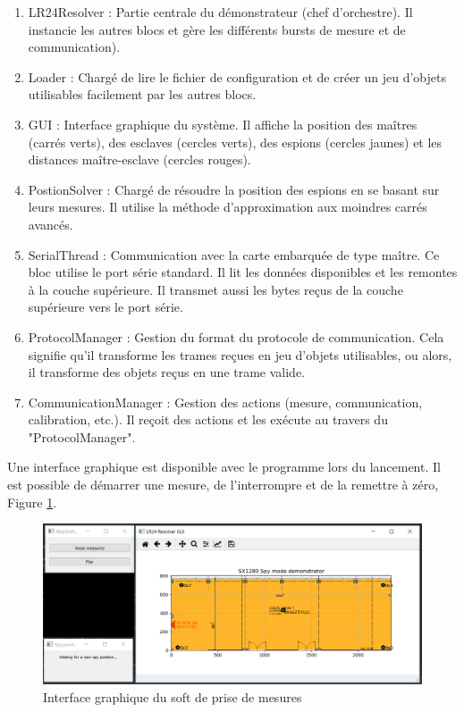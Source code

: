 \begin{enumerate}
 \item LR24Resolver : Partie centrale du démonstrateur (chef d’orchestre). Il instancie les autres blocs et gère les différents bursts de mesure et de communication).
 \item Loader : Chargé de lire le fichier de configuration et de créer un jeu d’objets utilisables facilement par les autres blocs.
 \item GUI : Interface graphique du système. Il affiche la position des maîtres (carrés verts), des esclaves (cercles verts), des espions (cercles jaunes) et les distances maître-esclave (cercles rouges).
 \item PostionSolver : Chargé de résoudre la position des espions en se basant sur leurs mesures. Il utilise la méthode d’approximation aux moindres carrés avancés.
 \item SerialThread : Communication avec la carte embarquée de type maître. Ce bloc utilise le port série standard. Il lit les données disponibles et les remontes à la couche supérieure. Il transmet aussi les bytes reçus de la couche supérieure vers le port série.
 \item ProtocolManager : Gestion du format du protocole de communication. Cela signifie qu’il transforme les trames reçues en jeu d’objets utilisables, ou alors, il transforme des objets reçus en une trame valide.
 \item CommunicationManager : Gestion des actions (mesure, communication, calibration, etc.). Il reçoit des actions et les exécute au travers du "ProtocolManager".
\end{enumerate}

Une interface graphique est disponible avec le programme lors du lancement. Il est possible de démarrer une mesure, de l'interrompre et de la remettre à zéro, Figure \ref{fig:GUI_LR24}.

\begin{figure}[htp]
 \begin{center}
  \includegraphics[scale=0.7]{figures/LR24_GUI.png}
  \caption{Interface graphique du soft de prise de mesures}
  \label{fig:GUI_LR24} %
 \end{center}
\end{figure}

